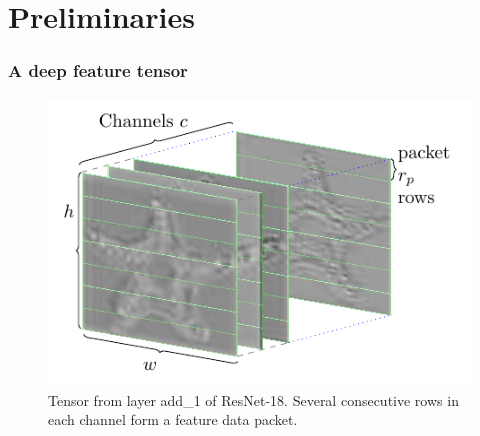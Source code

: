 \documentclass{beamer}
\begin{document}
\section{Preliminaries}
\begin{frame}
	\frametitle{A deep feature tensor}
	\begin{figure}[H]
		\centering\includegraphics[scale=0.9]{tensorlostviz3icip.pdf}
		\caption{Tensor from layer add\_1 of ResNet-18. Several consecutive rows in each channel form a feature data packet.}
	\end{figure}
\end{frame}
\end{document}
